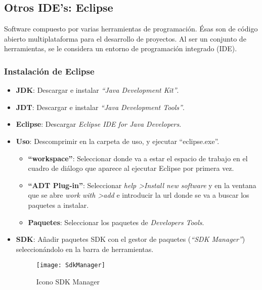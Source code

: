 	\subsection{Otros IDE's: Eclipse\cite{19:eclipse:online}}
	Software compuesto por varias herramientas de programación. Ésas son de código abierto multiplataforma para el desarrollo de proyectos. Al ser un conjunto de herramientas, se le considera un entorno de programación integrado (IDE)\cite{12:ide:online}.
	
	\subsubsection{Instalación de Eclipse}
		\begin{itemize}
			\item {\bf JDK}: Descargar e instalar {\it ``Java Development Kit''}\cite{17:jdk:online}.
			\item {\bf JDT}: Descargar e instalar {\it ``Java Development Tools''}\cite{21:jdt:online}.
			\item {\bf Eclipse}: Descargar {\it Eclipse IDE for Java Developers}\cite{15:eclipse:online}.
			\item {\bf Uso}: Descomprimir en la carpeta de uso, y ejecutar ``eclipse.exe''.
			\begin{itemize}
				\item {\bf ``workspace''}: Seleccionar donde va a estar el espacio de trabajo en el cuadro de diálogo que aparece al ejecutar Eclipse por primera vez.
				\item {\bf ``ADT Plug-in''}\cite{20:andoirdSDK:online}: Seleccionar {\it help \textgreater Install new software} y en la ventana que se abre {\it work with \textgreater add} e introducir la url donde se va a buscar los paquetes a instalar.
				\item {\bf Paquetes}: Seleccionar los paquetes de {\it Developers Tools}.
			\end{itemize}
			\item {\bf SDK}: Añadir paquetes SDK con el gestor de paquetes ({\em ``SDK Manager''}) seleccionándolo en la barra de herramientas.
			\begin{figure}[h]
				\centering
				\texttt{[image: SdkManager]}
				\caption{Icono SDK Manager}
				\label{fig:SdkManager}
			\end{figure}
		\end{itemize}
	
